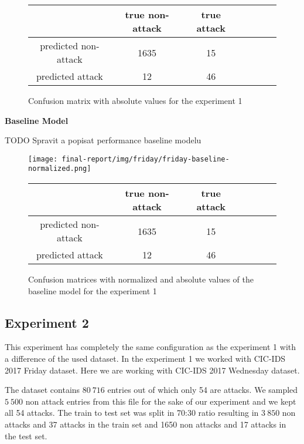 \documentclass{article}
\begin{document}
\begin{figure}[h!]
\centering
\begin{tabular}{ |c|c|c|c|c|c|c| }
 \hline
  & true non-attack & true attack \\
 \hline
 predicted non-attack & 1635 & 15 \\
 \hline
 predicted attack & 12 & 46 \\
 \hline
\end{tabular}
\caption{Confusion matrix with absolute values for the experiment 1}
\label{tab-friday-rf-absolute}
\end{figure}

\vspace{0.5cm}
\noindent\textbf{Baseline Model}

TODO Spravit a popisat performance baseline modelu\\

\begin{figure}[h!]
    \centering
    \texttt{[image: final-report/img/friday/friday-baseline-normalized.png]}

    \centering
    \begin{tabular}{ |c|c|c|c|c|c|c| }
     \hline
      & true non-attack & true attack \\
     \hline
     predicted non-attack & 1635 & 15 \\
     \hline
     predicted attack & 12 & 46 \\
     \hline
    \end{tabular}
    \caption{Confusion matrices with normalized and absolute values of the baseline model for the experiment 1}
    \label{fig-exp1-baseline}
\end{figure}




\subsection{Experiment 2}
This experiment has completely the same configuration as the experiment 1 with a difference of the used dataset. In the experiment 1 we worked with CIC-IDS 2017 Friday dataset. Here we are working with CIC-IDS 2017 Wednesday dataset.

The dataset contains $80\ 716$ entries out of which only 54 are attacks. We sampled $5\ 500$ non attack entries from this file for the sake of our experiment and we kept all 54 attacks. The train to test set was split in 70:30 ratio resulting in $3\ 850$ non attacks and 37 attacks in the train set and 1650 non attacks and 17 attacks in the test set.
\end{document}

